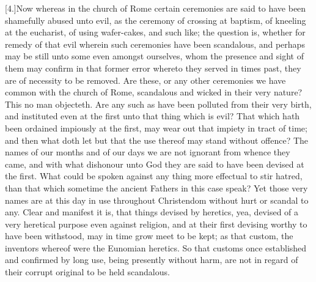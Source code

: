[4.]Now whereas in the church of Rome certain ceremonies are said to have been shamefully abused unto evil, as the ceremony of crossing at baptism, of kneeling at the eucharist, of using wafer-cakes, and such like; the question is, whether for remedy of that evil wherein such ceremonies have been scandalous, and perhaps may be still unto some even amongst ourselves, whom the presence and sight of them may confirm in that former error whereto they served in times past, they are of necessity to be removed. Are these, or any other ceremonies we have common with the church of Rome, scandalous and wicked in their very nature? This no man objecteth. Are any such as have been polluted from their very birth, and instituted even at the first unto that thing which is evil? That which hath been ordained impiously at the first, may wear out that impiety in tract of time; and then what doth let but that the use thereof may stand without offence? The names of our months and of our days we are not ignorant from whence they came, and with what dishonour unto God they are said to have been devised at the first. What could be spoken against any thing more effectual to stir hatred, than that which sometime the ancient Fathers in this case speak? Yet those very names are at this day in use  throughout Christendom without hurt or scandal to any. Clear and manifest it is, that things devised by heretics, yea, devised of a very heretical purpose even against religion, and at their first devising worthy to have been withstood, may in time grow meet to be kept; as that custom, the inventors whereof were the Eunomian heretics. So that customs once established and confirmed by long use, being presently without harm, are not in regard of their corrupt original to be held scandalous.

